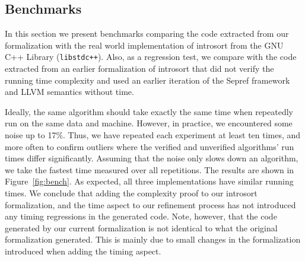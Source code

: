 \documentclass[acmsmall]{acmart}
\newcommand{\is}{\lstinline[language=isabelle]}
\begin{document}
\begin{comment}
  An alternative would be to abstractly specify a comparison function, and instantiate it during the last refinement step performed by sepref. 
  
  Currencies: we choose to specify the cost of the comparison function, abstract and concrete, already in the concrete currency system, instead of introducing an abstract compare coin and a time-refinement specific on the implementation. While the latter would also be possible, in the parameterized setting, it has no advantages, as the parameter for the compare cost is as concise to write as an abstract compare coin.
  
\end{comment}

% 



\subsection{Benchmarks}\label{sec:benchmarks}
In this section we present benchmarks comparing the code extracted from our formalization with the real world implementation of introsort from the GNU C++ Library (\is{libstdc++}). Also, as a regression test, we compare with the code extracted from an earlier formalization of introsort \cite{Lammich20} that did not verify the running time complexity and used an earlier iteration of the Sepref framework and LLVM semantics without time. 

Ideally, the same algorithm should take exactly the same time when repeatedly run on the same data and machine. However, in practice,  we encountered some noise up to 17\%. Thus, we have repeated each experiment at least ten times, and more often to confirm outliers where the verified and unverified algorithms' run times differ significantly. Assuming that the noise only slows down an algorithm, we take the fastest time measured over all repetitions.
The results are shown in Figure~\ref{fig:bench}.
As expected, all three implementations have similar running times. 
We conclude that adding the complexity proof to our introsort formalization, and the time aspect to our refinement process has not introduced any timing regressions in the generated code.
Note, however, that the code generated by our current formalization is not identical to what the original formalization generated.
This is mainly due to small changes in the formalization introduced when adding the timing aspect.
\end{document}
